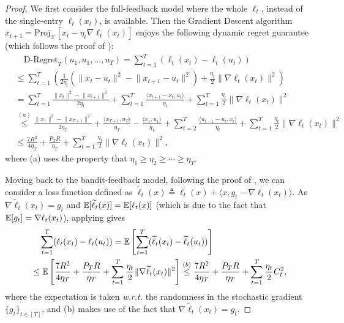 \documentclass[11pt,fullpage,letterpaper]{article} %
\renewcommand{\bm}[1]{#1}%
\renewcommand{\tilde}{\widetilde}
\newcommand{\E}{\operatornamewithlimits{\mathbb{E}}}
\begin{document}
\begin{proof}
We first consider the full-feedback model where the whole $\ell_t$, instead of the single-entry $\ell_t(\bm x_t)$, is available.
Then the Gradient Descent algorithm $\bm x_{t+1}=\text{Proj}_{\mathcal X}[\bm x_t-\eta_t \nabla \ell_t(\bm x_t)]$ enjoys the following dynamic regret guarantee (which follows the proof of \citet[Theorem 2]{zinkevich2003online}):
\begin{align}
&\quad \text{D-Regret}_T(\bm u_1,\bm u_1,\ldots,\bm u_T)=\sum_{t=1}^T (\ell_t(\bm x_t)-\ell_t(\bm u_t)) \nonumber\\
&\le \sum_{t=1}^T \left (\frac{1}{2\eta_t} \left (\lVert \bm x_t-\bm u_t\rVert^2-\lVert \bm x_{t+1}-\bm u_t\rVert^2\right )+\frac{\eta_t}{2}\lVert \nabla \ell_t(\bm x_t)\rVert^2\right ) \nonumber\\
&= \sum_{t=1}^T \frac{\lVert \bm x_t\rVert^2-\lVert \bm x_{t+1}\rVert^2}{2\eta_t}+\sum_{t=1}^T \frac{\langle \bm x_{t+1}-\bm x_t,\bm u_t\rangle}{\eta_t}+\sum_{t=1}^T \frac{\eta_t}{2} \lVert \nabla \ell_t(x_t)\rVert^2 \nonumber\\
&\overset{(a)}{\le}\frac{\lVert \bm x_1\rVert^2-\lVert \bm x_{T+1}\rVert^2}{2\eta_T}+\frac{\langle \bm x_{T+1},\bm u_T\rangle}{\eta_T}-\frac{\langle \bm x_{1},\bm u_1\rangle}{\eta_1}+\sum_{t=2}^T \frac{\langle \bm u_{t-1}-\bm u_t,\bm x_t\rangle}{\eta_t}+\sum_{t=1}^T \frac{\eta_t}{2} \lVert \nabla \ell_t(x_t)\rVert^2 \nonumber\\
&\le \frac{7R^2}{4\eta_T}+\frac{P_T R}{\eta_T}+\sum_{t=1}^T \frac{\eta_t}{2} \lVert \nabla \ell_t(x_t)\rVert^2,\label{eq:full information OGD D-Regret}
\end{align}
where (a) uses the property that $\eta_1\ge \eta_2\ge \cdots \ge \eta_T$.

Moving back to the bandit-feedback model, following the proof of \citet[Theorem 8]{zhao2021bandit}, we can consider a loss function defined as $\tilde \ell_t(x)\triangleq \ell_t(x)+\langle \bm x,\bm g_t-\nabla \ell_t(\bm x_t)\rangle$.
As $\nabla \tilde \ell_t(\bm x_t)=\bm g_t$ and $\E[\tilde \ell_t(\bm x)]=\E[\ell_t(\bm x)]$ (which is due to the fact that $\E[\bm g_t]=\nabla \ell_t(\bm x_t)$), applying  gives
\begin{align*}
&\quad \sum_{t=1}^T (\ell_t(\bm x_t)-\ell_t(\bm u_t))=\E\left [\sum_{t=1}^T (\tilde \ell_t(\bm x_t)-\tilde \ell_t(\bm u_t))\right ]\\
&\le \E\left [\frac{7R^2}{4\eta_T}+\frac{P_T R}{\eta_T}+\sum_{t=1}^T \frac{\eta_t}{2} \lVert \nabla \tilde \ell_t(\bm x_t)\rVert^2\right ]\overset{(b)}{\le} \frac{7R^2}{4\eta_T}+\frac{P_T R}{\eta_T}+\sum_{t=1}^T \frac{\eta_t}{2} C_t^2,
\end{align*}
where the expectation is taken \textit{w.r.t.} the randomness in the stochastic gradient $\{\bm g_t\}_{t\in [T]}$, and (b) makes use of the fact that $\nabla \tilde \ell_t(\bm x_t)=\bm g_t$.
\end{proof}
\end{document}
